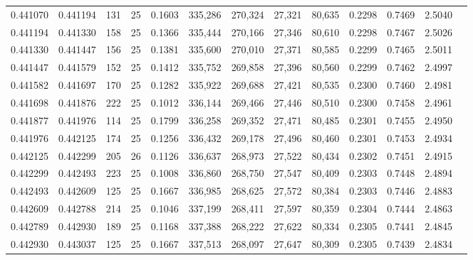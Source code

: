 \begin{tabular}{rrrrrrrrrrrrr}
0.441070 & 0.441194 &   131 &  25 &                                     0.1603 & 335,286 & 270,324 &  27,321 &  80,635 & 0.2298 & 0.7469 & 2.5040 \\
0.441194 & 0.441330 &   158 &  25 &                                     0.1366 & 335,444 & 270,166 &  27,346 &  80,610 & 0.2298 & 0.7467 & 2.5026 \\
0.441330 & 0.441447 &   156 &  25 &                                     0.1381 & 335,600 & 270,010 &  27,371 &  80,585 & 0.2299 & 0.7465 & 2.5011 \\
0.441447 & 0.441579 &   152 &  25 &                                     0.1412 & 335,752 & 269,858 &  27,396 &  80,560 & 0.2299 & 0.7462 & 2.4997 \\
0.441582 & 0.441697 &   170 &  25 &                                     0.1282 & 335,922 & 269,688 &  27,421 &  80,535 & 0.2300 & 0.7460 & 2.4981 \\
0.441698 & 0.441876 &   222 &  25 &                                     0.1012 & 336,144 & 269,466 &  27,446 &  80,510 & 0.2300 & 0.7458 & 2.4961 \\
0.441877 & 0.441976 &   114 &  25 &                                     0.1799 & 336,258 & 269,352 &  27,471 &  80,485 & 0.2301 & 0.7455 & 2.4950 \\
0.441976 & 0.442125 &   174 &  25 &                                     0.1256 & 336,432 & 269,178 &  27,496 &  80,460 & 0.2301 & 0.7453 & 2.4934 \\
0.442125 & 0.442299 &   205 &  26 &                                     0.1126 & 336,637 & 268,973 &  27,522 &  80,434 & 0.2302 & 0.7451 & 2.4915 \\
0.442299 & 0.442493 &   223 &  25 &                                     0.1008 & 336,860 & 268,750 &  27,547 &  80,409 & 0.2303 & 0.7448 & 2.4894 \\
0.442493 & 0.442609 &   125 &  25 &                                     0.1667 & 336,985 & 268,625 &  27,572 &  80,384 & 0.2303 & 0.7446 & 2.4883 \\
0.442609 & 0.442788 &   214 &  25 &                                     0.1046 & 337,199 & 268,411 &  27,597 &  80,359 & 0.2304 & 0.7444 & 2.4863 \\
0.442789 & 0.442930 &   189 &  25 &                                     0.1168 & 337,388 & 268,222 &  27,622 &  80,334 & 0.2305 & 0.7441 & 2.4845 \\
0.442930 & 0.443037 &   125 &  25 &                                     0.1667 & 337,513 & 268,097 &  27,647 &  80,309 & 0.2305 & 0.7439 & 2.4834 \\

\end{tabular}
